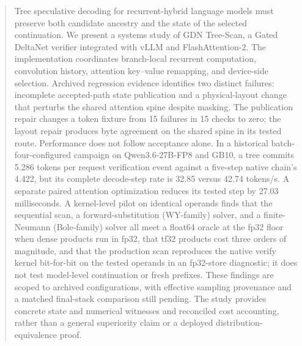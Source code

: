 \begin{abstract}
Tree speculative decoding for recurrent-hybrid language models must preserve both candidate ancestry and the state of the selected continuation. We present a systems study of GDN Tree-Scan, a Gated DeltaNet verifier integrated with vLLM and FlashAttention-2. The implementation coordinates branch-local recurrent computation, convolution history, attention key--value remapping, and device-side selection. Archived regression evidence identifies two distinct failures: incomplete accepted-path state publication and a physical-layout change that perturbs the shared attention spine despite masking. The publication repair changes a token fixture from 15 failures in 15 checks to zero; the layout repair produces byte agreement on the shared spine in its tested route. Performance does not follow acceptance alone. In a historical batch-four-configured campaign on Qwen3.6-27B-FP8 and GB10, a tree commits 5.286 tokens per request verification event against a five-step native chain's 4.422, but its complete decode-step rate is 32.85 versus 42.74 tokens/s. A separate paired attention optimization reduces its tested step by 27.03 milliseconds. A kernel-level pilot on identical operands finds that the sequential scan, a forward-substitution (WY-family) solver, and a finite-Neumann (Bole-family) solver all meet a float64 oracle at the fp32 floor when dense products run in fp32, that tf32 products cost three orders of magnitude, and that the production scan reproduces the native verify kernel bit-for-bit on the tested operands in an fp32-store diagnostic; it does not test model-level continuation or fresh prefixes. These findings are scoped to archived configurations, with effective sampling provenance and a matched final-stack comparison still pending. The study provides concrete state and numerical witnesses and reconciled cost accounting, rather than a general superiority claim or a deployed distribution-equivalence proof.
\end{abstract}
